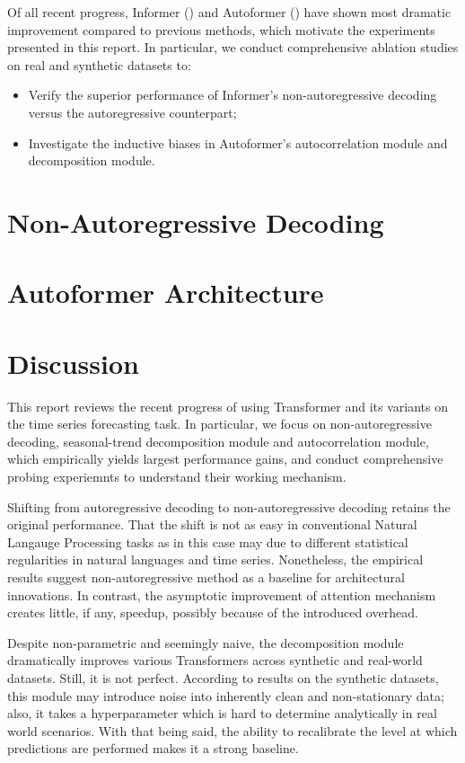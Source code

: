 \documentclass[12pt]{article}
\begin{document}
Of all recent progress, Informer (\citet{https://doi.org/10.48550/arxiv.2012.07436}) and Autoformer (\citet{https://doi.org/10.48550/arxiv.2106.13008}) have shown most dramatic improvement compared to previous methods, which motivate the experiments presented in this report. 
In particular, we conduct comprehensive ablation studies on real and synthetic datasets to: \begin{itemize}
    \item Verify the superior performance of Informer's non-autoregressive decoding versus the autoregressive counterpart; 
    \item Investigate the inductive biases in Autoformer's autocorrelation module and decomposition module. 
\end{itemize}


\section{Non-Autoregressive Decoding}



\section{Autoformer Architecture}



\section{Discussion}
This report reviews the recent progress of using Transformer and its variants on the time series forecasting task. 
In particular, we focus on non-autoregressive decoding, seasonal-trend decomposition module and autocorrelation module, which empirically yields largest performance gains, and conduct comprehensive probing experiemnts to understand their working mechanism. 

Shifting from autoregressive decoding to non-autoregressive decoding retains the original performance. 
That the shift is not as easy in conventional Natural Langauge Processing tasks as in this case may due to different statistical regularities in natural languages and time series. 
Nonetheless, the empirical results suggest non-autoregressive method as a baseline for architectural innovations. 
In contrast, the asymptotic improvement of attention mechanism creates little, if any, speedup, possibly because of the introduced overhead. 

Despite non-parametric and seemingly naive, the decomposition module dramatically improves various Transformers across synthetic and real-world datasets. 
Still, it is not perfect. According to results on the synthetic datasets, this module may introduce noise into inherently clean and non-stationary data; also, it takes a hyperparameter which is hard to determine analytically in real world scenarios. 
With that being said, the ability to recalibrate the level at which predictions are performed makes it a strong baseline. 
\end{document}
